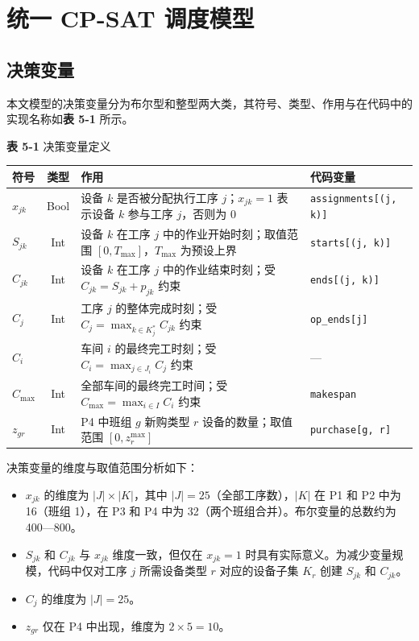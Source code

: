 \documentclass[UTF8,a4paper,12pt]{ctexart}
\begin{document}
\section{统一 CP-SAT 调度模型}

\subsection{决策变量}
本文模型的决策变量分为布尔型和整型两大类，其符号、类型、作用与在代码中的实现名称如\textbf{表 5-1} 所示。

\begin{center}
\textbf{表 5-1} 决策变量定义
\begin{tabular}{lcll}
\toprule
符号 & 类型 & 作用 & 代码变量 \\
\midrule
$x_{jk}$ & Bool & 设备 $k$ 是否被分配执行工序 $j$；$x_{jk}=1$ 表示设备 $k$ 参与工序 $j$，否则为 0 & \texttt{assignments[(j, k)]} \\
$S_{jk}$ & Int & 设备 $k$ 在工序 $j$ 中的作业开始时刻；取值范围 $[0, T_{\max}]$，$T_{\max}$ 为预设上界 & \texttt{starts[(j, k)]} \\
$C_{jk}$ & Int & 设备 $k$ 在工序 $j$ 中的作业结束时刻；受 $C_{jk} = S_{jk} + p_{jk}$ 约束 & \texttt{ends[(j, k)]} \\
$C_j$ & Int & 工序 $j$ 的整体完成时刻；受 $C_j = \max_{k \in K_j^*} C_{jk}$ 约束 & \texttt{op\_ends[j]} \\
$C_i$ &  & 车间 $i$ 的最终完工时刻；受 $C_i = \max_{j \in J_i} C_j$ 约束 & — \\
$C_{\max}$ & Int & 全部车间的最终完工时间；受 $C_{\max} = \max_{i \in I} C_i$ 约束 & \texttt{makespan} \\
$z_{gr}$ & Int & P4 中班组 $g$ 新购类型 $r$ 设备的数量；取值范围 $[0, z_r^{\max}]$ & \texttt{purchase[g, r]} \\
\bottomrule
\end{tabular}
\end{center}

决策变量的维度与取值范围分析如下：

\begin{itemize}
    \item $x_{jk}$ 的维度为 $|J| \times |K|$，其中 $|J| = 25$（全部工序数），$|K|$ 在 P1 和 P2 中为 16（班组 1），在 P3 和 P4 中为 32（两个班组合并）。布尔变量的总数约为 400—800。
    \item $S_{jk}$ 和 $C_{jk}$ 与 $x_{jk}$ 维度一致，但仅在 $x_{jk} = 1$ 时具有实际意义。为减少变量规模，代码中仅对工序 $j$ 所需设备类型 $r$ 对应的设备子集 $K_r$ 创建 $S_{jk}$ 和 $C_{jk}$。
    \item $C_j$ 的维度为 $|J| = 25$。
    \item $z_{gr}$ 仅在 P4 中出现，维度为 $2 \times 5 = 10$。
\end{itemize}
\end{document}
